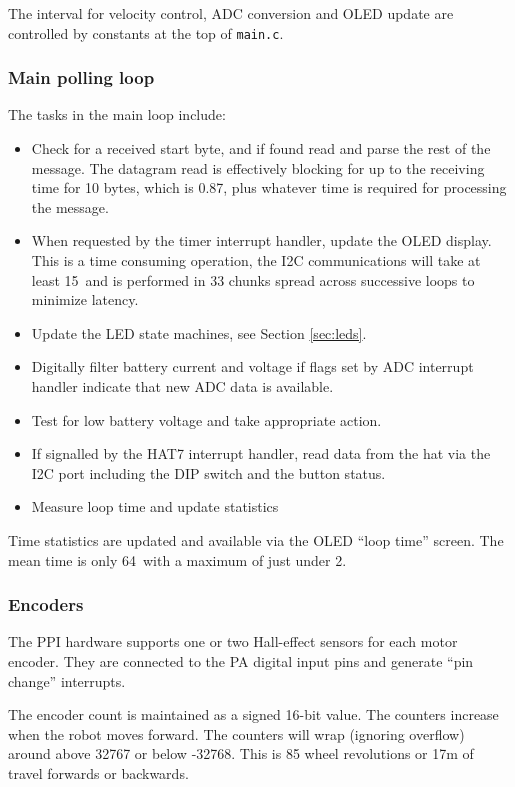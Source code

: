 \documentclass[11pt,fleqn]{article}
\begin{document}
The interval for velocity control, ADC conversion and OLED update are controlled by constants at the top of \texttt{main.c}.

\subsubsection{Main polling loop}
The tasks in the main loop include:
\begin{itemize}
\item Check for a received start byte, and if found read and parse the rest of the message.
The datagram read is effectively blocking for up to the receiving time for 10 bytes, which is 0.87\ms, plus whatever time is
required for processing the message.  
\item When requested by the timer interrupt handler, update the OLED display.  This is a time consuming operation, the I2C communications will take at least 15\ms\ and is performed in 33 chunks spread across successive loops to minimize latency.
\item Update the LED state machines, see Section \ref{sec:leds}.
\item Digitally filter  battery current and voltage if flags set by ADC interrupt handler indicate that new ADC data is available.
\item Test for low battery voltage and take appropriate action.
\item If signalled by the HAT7 interrupt handler, read data from the hat via the I2C port including the DIP switch and the button status.
\item Measure loop time and update statistics
\end{itemize}

Time statistics are updated and available via the OLED ``loop time'' screen. The mean time is only 64\us\ with a maximum of
just under 2\ms. 

\subsubsection{Encoders}\label{sec:encoder}
The PPI hardware supports one or two Hall-effect sensors for each motor encoder.  They are connected to the PA digital input pins
and generate ``pin change'' interrupts.

The encoder count is maintained as a signed 16-bit value.  The counters increase when the robot moves forward.
The counters will wrap  (ignoring overflow) around above 32767 or below -32768.  This is 85 wheel revolutions or 17\unit{m} of travel forwards or backwards.
\end{document}

